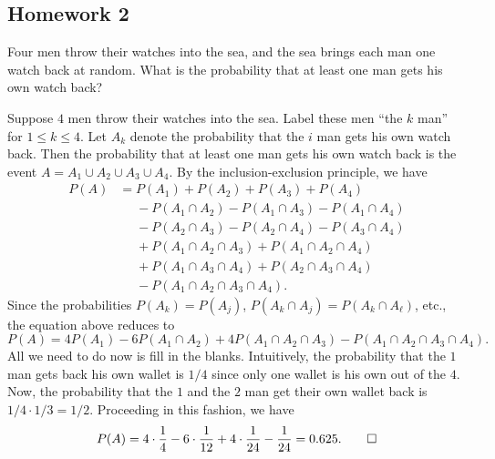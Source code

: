 \subsection{Homework 2}
\begin{problem}[Handout 2, \# 5]
  Four men throw their watches into the sea, and the sea brings each man
  one watch back at random. What is the probability that at least one man
  gets his own watch back?
\end{problem}
\begin{solution*}
  Suppose \(4\) men throw their watches into the sea. Label these men ``the
  \(k\) man'' for \(1\leq k\leq 4\). Let \(A_k\) denote the
  probability that the \(i\) man gets his own watch back. Then
  the probability that at least one man gets his own watch back is the
  event \(A=A_1\cup A_2\cup A_3\cup A_4\). By the inclusion-exclusion
  principle, we have
  \begin{equation}
    \label{eq:inclusion-exclusion-4}
    \begin{aligned}
      P(
      A)&=P(A_1)+P(A_2)+P(A_3)+P(A_4)\\
      &\phantom{{}={}}-P(A_1\cap A_2)-P(A_1\cap A_3)-P(A_1\cap A_4)\\
      &\phantom{{}={}}-P(A_2\cap A_3)-P(A_2\cap A_4)-P(A_3\cap A_4)\\
      &\phantom{{}={}}+P(A_1\cap A_2\cap A_3)+P(A_1\cap A_2\cap A_4)\\
      &\phantom{{}={}}+P(A_1\cap A_3\cap A_4)+P(A_2\cap A_3\cap A_4)\\
      &\phantom{{}={}}-P(A_1\cap A_2\cap A_3\cap A_4).
    \end{aligned}
  \end{equation}
  Since the probabilities \(P(A_k)=P(A_j)\), \(P(A_k\cap A_j)=P(A_k\cap
  A_\ell)\), etc., the equation above reduces to
  \[
    P(A)=4P(A_1)-6P(A_1\cap A_2)+4P(A_1\cap A_2\cap A_3)-P(A_1\cap A_2\cap
    A_3\cap A_4).
  \]
  All we need to do now is fill in the blanks. Intuitively, the probability
  that the \(1\) man gets back his own wallet is \(1/4\) since
  only one wallet is his own out of the \(4\). Now, the probability that
  the \(1\) and the \(2\) man get their own wallet
  back is \(1/4\cdot1/3=1/2\). Proceeding in this fashion, we have
  \[
    P(A)=4\cdot\frac{1}{4}-6\cdot\frac{1}{12}+4\cdot\frac{1}{24}-\frac{1}{24}
    =0.625.\qedhere
  \]
\end{solution*}

